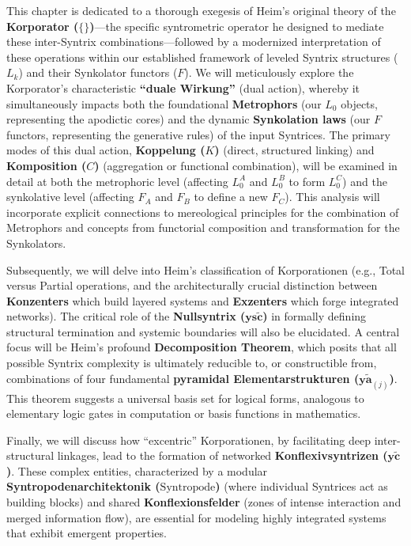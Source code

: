 \documentclass[
    12pt,              %
    a4paper,           %
    headings=normal,   %
    twoside=true,      %
    BCOR=8mm,          %
]{scrbook}
\newcommand{\q}[1]{\enquote{#1}}
\newcommand{\nullsyntrix}{\bm{ys\widetilde{c}}}
\newcommand{\elementarstruktur}{\bm{y\widetilde{a}}_{(j)}}
\newcommand{\konflexivsyntrix}{\bm{y\widetilde{c}}}
\newcommand{\syntropode}{\text{Syntropode}}
\begin{document}
This chapter is dedicated to a thorough exegesis of Heim's original theory of the \textbf{Korporator (\(\{ \}\))}—the specific syntrometric operator he designed to mediate these inter-Syntrix combinations—followed by a modernized interpretation of these operations within our established framework of leveled Syntrix structures (\(L_k\)) and their Synkolator functors (\(F\)). We will meticulously explore the Korporator’s characteristic \textbf{\q{duale Wirkung}} (dual action), whereby it simultaneously impacts both the foundational \textbf{Metrophors} (our \(L_0\) objects, representing the apodictic cores) and the dynamic \textbf{Synkolation laws} (our \(F\) functors, representing the generative rules) of the input Syntrices. The primary modes of this dual action, \textbf{Koppelung (\(K\))} (direct, structured linking) and \textbf{Komposition (\(C\))} (aggregation or functional combination), will be examined in detail at both the metrophoric level (affecting \(L_0^A\) and \(L_0^B\) to form \(L_0^C\)) and the synkolative level (affecting \(F_A\) and \(F_B\) to define a new \(F_C\)). This analysis will incorporate explicit connections to mereological principles for the combination of Metrophors and concepts from functorial composition and transformation for the Synkolators.

Subsequently, we will delve into Heim’s classification of Korporationen (e.g., Total versus Partial operations, and the architecturally crucial distinction between \textbf{Konzenters} which build layered systems and \textbf{Exzenters} which forge integrated networks). The critical role of the \textbf{Nullsyntrix (\(\nullsyntrix\))} in formally defining structural termination and systemic boundaries will also be elucidated. A central focus will be Heim's profound \textbf{Decomposition Theorem}, which posits that all possible Syntrix complexity is ultimately reducible to, or constructible from, combinations of four fundamental \textbf{pyramidal Elementarstrukturen (\(\elementarstruktur\))}. This theorem suggests a universal basis set for logical forms, analogous to elementary logic gates in computation or basis functions in mathematics.

Finally, we will discuss how \q{excentric} Korporationen, by facilitating deep inter-structural linkages, lead to the formation of networked \textbf{Konflexivsyntrizen (\(\konflexivsyntrix\))}. These complex entities, characterized by a modular \textbf{Syntropodenarchitektonik (\(\syntropode\))} (where individual Syntrices act as building blocks) and shared \textbf{Konflexionsfelder} (zones of intense interaction and merged information flow), are essential for modeling highly integrated systems that exhibit emergent properties.
\end{document}
